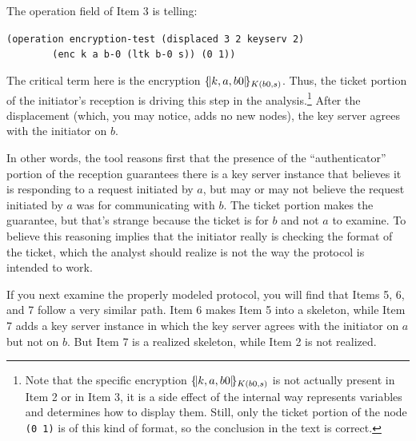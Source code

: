 The operation field of Item 3 is telling:

\begin{center}
\verb|(operation encryption-test (displaced 3 2 keyserv 2)|\\
\verb|        (enc k a b-0 (ltk b-0 s)) (0 1))|
\end{center}

The critical term here is the encryption $\{\!|k,a,b0|\!\}_{K(b0,s)}$.
Thus, the ticket portion of the initiator's reception is driving this
step in the analysis.\footnote{Note that the specific encryption
  $\{\!|k,a,b0|\!\}_{K(b0,s)}$ is not actually present in Item 2 or in Item
  3, it is a side effect of the internal way {\cpsa} represents
  variables and determines how to display them.  Still, only the
  ticket portion of the node \texttt{(0 1)} is of this kind of format,
  so the conclusion in the text is correct.}  After the displacement
(which, you may notice, adds no new nodes), the key server agrees with
the initiator on $b$.

In other words, the tool reasons first that the presence of the
``authenticator'' portion of the reception guarantees there is a key
server instance that believes it is responding to a request initiated
by $a$, but may or may not believe the request initiated by $a$ was
for communicating with $b$.  The ticket portion makes the guarantee,
but that's strange because the ticket is for $b$ and not $a$ to
examine.  To believe this reasoning implies that the initiator really
is checking the format of the ticket, which the analyst should realize
is not the way the protocol is intended to work.

If you next examine the properly modeled protocol, you will find that
Items 5, 6, and 7 follow a very similar path.  Item 6 makes Item 5 into
a skeleton, while Item 7 adds a key server instance in which the key
server agrees with the initiator on $a$ but not on $b$.  But Item 7 is
a realized skeleton, while Item 2 is not realized.
